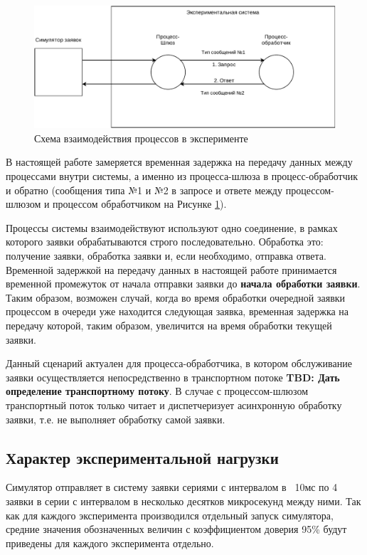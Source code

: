 \begin{figure}[!h]
\caption{Схема взаимодействия процессов в эксперименте}
\label{chapter41:SystemSchema}
\includegraphics[width=\textwidth]{../../graphics/schemes/SystemSchema}
\end{figure}

В настоящей работе замеряется временная задержка на передачу данных между процессами внутри системы, а именно из процесса-шлюза в процесс-обработчик и обратно (сообщения типа №1 и №2 в запросе и ответе между процессом-шлюзом и процессом обработчиком на Рисунке \ref{chapter41:SystemSchema}).

Процессы системы взаимодействуют используют одно соединение, в рамках которого заявки обрабатываются строго последовательно.
Обработка это: получение заявки, обработка заявки и, если необходимо, отправка ответа.
Временной задержкой на передачу данных в настоящей работе принимается временной промежуток от начала отправки заявки до \textbf{начала обработки заявки}. Таким образом, возможен случай, когда во время обработки очередной заявки процессом в очереди уже находится следующая заявка, временная задержка на передачу которой, таким образом, увеличится на время обработки текущей заявки.

Данный сценарий актуален для процесса-обработчика, в котором обслуживание заявки осуществляется непосредственно в транспортном потоке \textbf{TBD: Дать определение транспортному потоку}. В случае с процессом-шлюзом транспортный поток только читает и диспетчеризует асинхронную обработку заявки, т.е. не выполняет обработку самой заявки.

\subsection{Характер экспериментальной нагрузки}

Симулятор отправляет в систему заявки сериями с интервалом в ~10мс по 4 заявки в серии с интервалом в несколько десятков микросекунд между ними. Так как для каждого эксперимента производился отдельный запуск симулятора, средние значения обозначенных величин с коэффициентом доверия 95\% будут приведены для каждого эксперимента отдельно.

